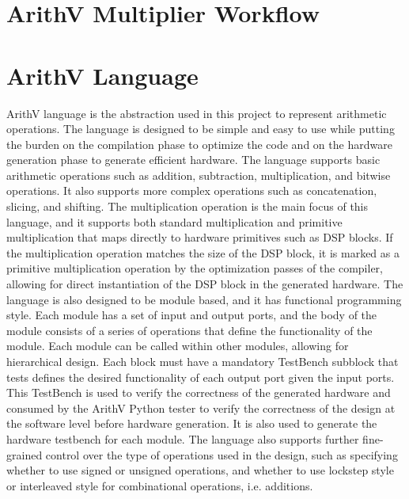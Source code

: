 \section{ArithV Multiplier Workflow}








\section{ArithV Language}
ArithV language is the abstraction used in this project to represent arithmetic operations.
The language is designed to be simple and easy to use while putting the burden on the compilation phase to optimize the code and on the hardware generation phase to generate efficient hardware.
The language supports basic arithmetic operations such as addition, subtraction, multiplication, and bitwise operations.
It also supports more complex operations such as concatenation, slicing, and shifting. 
The multiplication operation is the main focus of this language, and it supports both standard multiplication and primitive multiplication that maps directly to hardware primitives such as DSP blocks.
If the multiplication operation matches the size of the DSP block, it is marked as a primitive multiplication operation by the optimization passes of the compiler, allowing for direct instantiation of the DSP block in the generated hardware.
The language is also designed to be module based, and it has functional programming style. 
Each module has a set of input and output ports, and the body of the module consists of a series of operations that define the functionality of the module.
Each module can be called within other modules, allowing for hierarchical design.
Each block must have a mandatory TestBench subblock that tests defines the desired functionality of each output port given the input ports. 
This TestBench is used to verify the correctness of the generated hardware and consumed by the ArithV Python tester to verify the correctness of the design at the software level before hardware generation.
It is also used to generate the hardware testbench for each module. 
The language also supports further fine-grained control over the type of operations used in the design, such as specifying whether to use signed or unsigned operations, and whether to use lockstep style or interleaved style for combinational operations, i.e. additions. 
